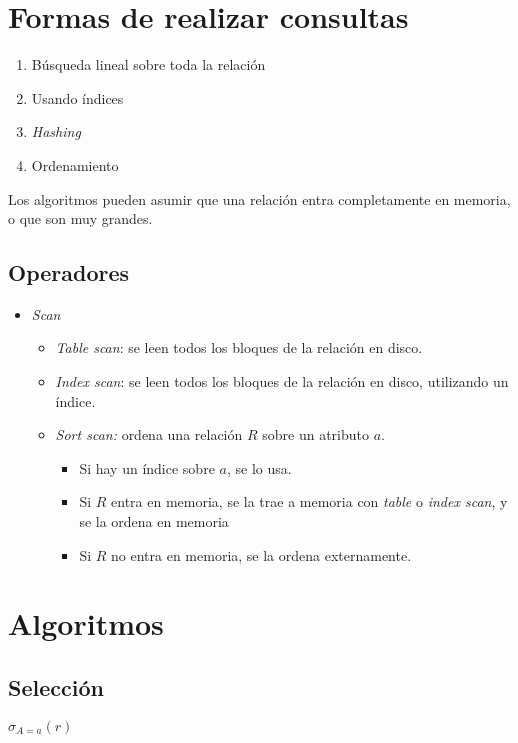 \documentclass[a4paper, twoside]{article}
\begin{document}
\section{Formas de realizar consultas}
\begin{enumerate}
	\item Búsqueda lineal sobre toda la relación
	\item Usando índices
	\item \emph{Hashing}
	\item Ordenamiento
\end{enumerate}

Los algoritmos pueden asumir que una relación entra completamente en memoria, o que son muy grandes.

\subsection{Operadores}
\begin{itemize}
	\item \emph{Scan}
	\begin{itemize}
		\item \emph{Table scan}: se leen todos los bloques de la relación en disco.
		\item \emph{Index scan}: se leen todos los bloques de la relación en disco, utilizando un índice.
		\item \emph{Sort scan:} ordena una relación $R$ sobre un atributo $a$.
		\begin{itemize}
			\item Si hay un índice sobre $a$, se lo usa.
			\item Si $R$ entra en memoria, se la trae a memoria con \emph{table} o \emph{index scan}, y se la ordena en memoria
			\item Si $R$ no entra en memoria, se la ordena externamente.
		\end{itemize}
	\end{itemize}
\end{itemize}

\section{Algoritmos}
\subsection{Selección}
$\sigma_{A=a}(r)$
\end{document}
